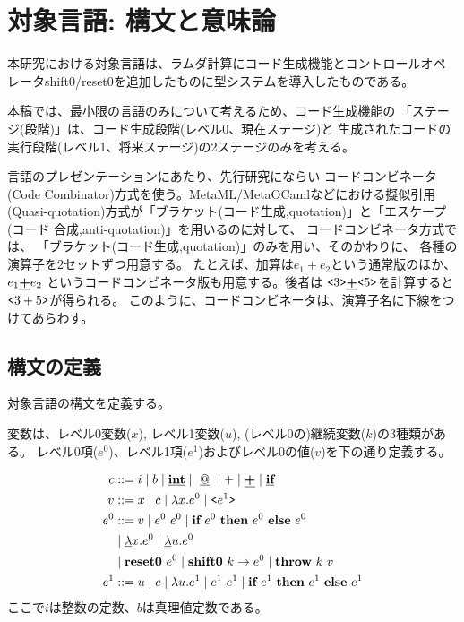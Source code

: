 
\section{対象言語: 構文と意味論}

本研究における対象言語は、ラムダ計算にコード生成機能とコントロールオペ
レータshift0/reset0を追加したものに型システムを導入したものである。

本稿では、最小限の言語のみについて考えるため、コード生成機能の
「ステージ(段階)」は、コード生成段階(レベル0、現在ステージ)と
生成されたコードの実行段階(レベル1、将来ステージ)の2ステージのみを考える。

言語のプレゼンテーションにあたり、先行研究にならい
コードコンビネータ(Code Combinator)方式を使う。MetaML/MetaOCamlなどにおける擬似引用
(Quasi-quotation)方式が「ブラケット(コード生成,quotation)」と「エスケープ(コード
合成,anti-quotation)」を用いるのに対して、
コードコンビネータ方式では、
「ブラケット(コード生成,quotation)」のみを用い、そのかわりに、
各種の演算子を2セットずつ用意する。
たとえば、加算は$e_1+e_2$という通常版のほか、
$e_1 \underline{\textbf{+}} e_2$ というコードコンビネータ版も用意する。後者は
$\texttt{<}{3}\texttt{>} \underline{\textbf{+}} \texttt{<}{5}\texttt{>}$を計算すると$\texttt{<}{3+5}\texttt{>}$が得られる。
このように、コードコンビネータは、演算子名に下線をつけてあらわす。

\subsection{構文の定義}

対象言語の構文を定義する。

変数は、レベル0変数($x$), レベル1変数($u$),
(レベル0の)継続変数($k$)の3種類がある。
レベル0項($e^0$)、レベル1項($e^1$)およびレベル0の値($v$)を下の通り定義する。

\begin{align*}
  c & ::= i \mid b \mid \underline{\textbf{int}} 
         \mid ~\underline{@}~ \mid + \mid \underline{\textbf{+}} \mid \underline{\textbf{if}} \\
  v & ::= x \mid c \mid \lambda{x}.{e^0} \mid \texttt{<}{e^1}\texttt{>} \\
  e^0 & ::=  v  \mid e^0~ e^0 \mid \textbf{if}~{e^0}~\textbf{then}~{e^0}~\textbf{else}~{e^0} \\
    & \mid \underline{\lambda}{x}.{e^0}
      \mid \underline{\underline{\lambda}}{u}.{e^0} \\
    & \mid \textbf{reset0}~{e^0}
      \mid \textbf{shift0}~{k}\to{e^0}
      \mid \textbf{throw}~{k}~{v} \\
  e^1 & ::=  u \mid c \mid \lambda{u}.{e^1} \mid e^1~ e^1 
      \mid \textbf{if}~{e^1}~\textbf{then}~{e^1}~\textbf{else}~{e^1} \\
\end{align*}
ここで$i$は整数の定数、$b$は真理値定数である。


